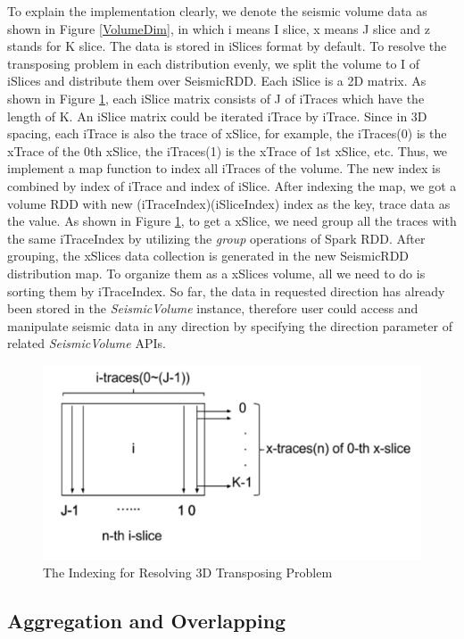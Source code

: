 To explain the implementation clearly, we denote the seismic volume data as shown in Figure \ref{VolumeDim}, in which i means I slice, x means J slice and z stands for K slice. The data is stored in iSlices format by default. To resolve the transposing problem in each distribution evenly, we split the volume to I of iSlices and distribute them over SeismicRDD. Each iSlice is a 2D matrix. As shown in Figure \ref{VolumeTrans}, each iSlice matrix consists of J of iTraces which have the length of K. An iSlice matrix could be iterated iTrace by iTrace. Since in 3D spacing, each iTrace is also the trace of xSlice, for example, the iTraces(0) is the xTrace of the 0th xSlice, the iTraces(1) is the xTrace of 1st xSlice, etc. Thus, we implement a map function to index all iTraces of the volume. The new index is combined by index of iTrace and index of iSlice. After indexing the map, we got a volume RDD with new (iTraceIndex)(iSliceIndex) index as the key, trace data as the value. As shown in Figure \ref{VolumeTrans}, to get a xSlice, we need group all the traces with the same iTraceIndex by utilizing the \emph{group} operations of Spark RDD. After grouping, the xSlices data collection is generated in the new SeismicRDD distribution map. To organize them as a xSlices volume, all we need to do is sorting them by iTraceIndex. So far, the data in requested direction has already been stored in the \emph{SeismicVolume} instance, therefore user could access and manipulate seismic data in any direction by specifying the direction parameter of related \emph{SeismicVolume} APIs.

\begin{figure}[h]
\centering
\includegraphics[scale=0.6]{figures/VolumeTrans.png}
\caption{The Indexing for Resolving 3D Transposing Problem}
\label{VolumeTrans}
\end{figure}


\subsection{Aggregation and Overlapping}

